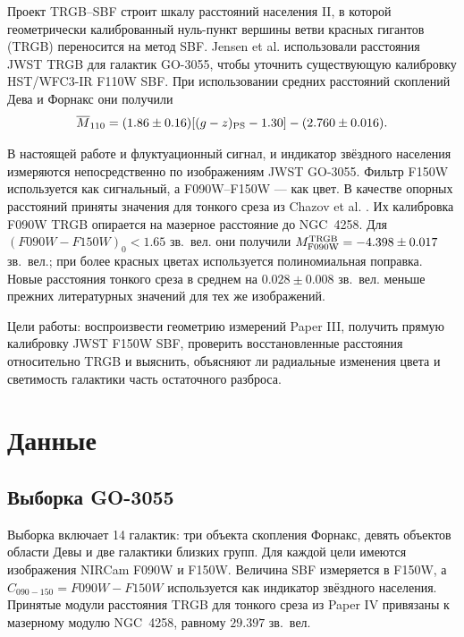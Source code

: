 \documentclass[10pt,a4paper,twocolumn]{article}
\newcommand{\Mbar}{\overline{M}}
\begin{document}
Проект TRGB--SBF строит шкалу расстояний населения II, в которой геометрически
калиброванный нуль-пункт вершины ветви красных гигантов (TRGB) переносится на
метод SBF. Jensen et al. \citep[далее Paper III;][]{Jensen2025} использовали
расстояния JWST TRGB для галактик GO-3055, чтобы уточнить существующую
калибровку HST/WFC3-IR F110W SBF. При использовании средних расстояний
скоплений Дева и Форнакс они получили
\[
 \Mbar_{110}=(1.86\pm0.16)[(g-z)_{\rm PS}-1.30]
             -(2.760\pm0.016).
\]

В настоящей работе и флуктуационный сигнал, и индикатор звёздного населения
измеряются непосредственно по изображениям JWST GO-3055. Фильтр F150W
используется как сигнальный, а F090W--F150W --- как цвет. В качестве опорных
расстояний приняты значения для тонкого среза из Chazov et al.
\citep[далее Paper IV;][]{Chazov2026}. Их калибровка F090W TRGB опирается на
мазерное расстояние до NGC~4258. Для
$(F090W-F150W)_0<1.65$ зв.\ вел. они получили
$M_{\rm F090W}^{\rm TRGB}=-4.398\pm0.017$ зв.\ вел.; при более красных цветах
используется полиномиальная поправка. Новые расстояния тонкого среза в среднем
на $0.028\pm0.008$ зв.\ вел. меньше прежних литературных значений для тех же
изображений.

Цели работы: воспроизвести геометрию измерений Paper III, получить прямую
калибровку JWST F150W SBF, проверить восстановленные расстояния относительно
TRGB и выяснить, объясняют ли радиальные изменения цвета и светимость
галактики часть остаточного разброса.

\section{Данные}

\subsection{Выборка GO-3055}

Выборка включает 14 галактик: три объекта скопления Форнакс, девять объектов
области Девы и две галактики близких групп. Для каждой цели имеются
изображения NIRCam F090W и F150W. Величина SBF измеряется в F150W, а
$C_{090-150}=F090W-F150W$ используется как индикатор звёздного населения.
Принятые модули расстояния TRGB для тонкого среза из Paper IV привязаны к
мазерному модулю NGC~4258, равному $29.397$ зв.\ вел.

\begin{table}
\centering
\caption{Измерения для калибровки F150W SBF по выборке GO-3055.
Предпоследний столбец содержит остаток SBF-расстояния при исключении данной
галактики из калибровки относительно принятого модуля TRGB из Paper IV. Знак
HQ IV показывает флаг high-quality из таблицы~2 Paper IV. Указанная
$\sigma_{\overline M}$ содержит индивидуальные, но не общие нуль-пункты.}
\label{tab:measurements}
\resizebox{\textwidth}{!}{%
}
\end{table}
\end{document}
